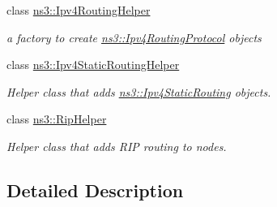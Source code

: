 \begin{DoxyCompactItemize}
class \hyperlink{classns3_1_1Ipv4RoutingHelper}{ns3\+::\+Ipv4\+Routing\+Helper}
\begin{DoxyCompactList}\small\item\em a factory to create \hyperlink{classns3_1_1Ipv4RoutingProtocol}{ns3\+::\+Ipv4\+Routing\+Protocol} objects \end{DoxyCompactList}\item 
class \hyperlink{classns3_1_1Ipv4StaticRoutingHelper}{ns3\+::\+Ipv4\+Static\+Routing\+Helper}
\begin{DoxyCompactList}\small\item\em Helper class that adds \hyperlink{classns3_1_1Ipv4StaticRouting}{ns3\+::\+Ipv4\+Static\+Routing} objects. \end{DoxyCompactList}\item 
class \hyperlink{classns3_1_1RipHelper}{ns3\+::\+Rip\+Helper}
\begin{DoxyCompactList}\small\item\em Helper class that adds R\+IP routing to nodes. \end{DoxyCompactList}\end{DoxyCompactItemize}


\subsection{Detailed Description}
